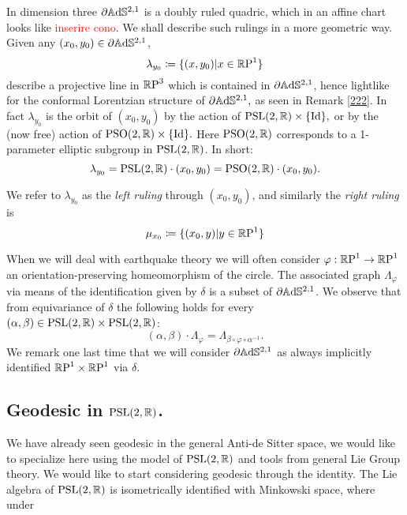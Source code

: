 In dimension three $\partial\A^{2,1}$ is a doubly ruled quadric, which in an affine chart looks like \textcolor{red}{inserire cono}. We shall describe such rulings in a more geometric way. Given any $(x_0,y_0)\in\partial\A^{2,1}$, 
\[
    \lambda_{y_0}\coloneqq\{(x,y_0)|x\in\R\text{P}^1\}
\]  
describe a projective line in $\R\text{P}^3$ which is contained in $\partial\A^{2,1}$, hence lightlike for the conformal Lorentzian structure of $\partial\A^{2,1},$ as seen in Remark \ref{222}. In fact $\lambda_{y_0}$ is the orbit of $(x_0,y_0)$ by the action of $\text{PSL}(2,\R)\times\{\text{Id}\},$ or by the (now free) action of $\text{PSO}(2,\R)\times\{\text{Id}\}.$ Here $\text{PSO}(2,\R)$ corresponds to a 1-parameter elliptic subgroup in $\text{PSL}(2,\R)$. In short: 
\[
    \lambda_{y_0}=\text{PSL}(2,\R)\cdot(x_0,y_0)=\text{PSO}(2,\R)\cdot(x_0,y_0).
\]

We refer to $\lambda_{y_0}$ as the \textit{left ruling} through $(x_0,y_0)$, and similarly the \textit{right ruling} is 
\[
    \mu_{x_0}\coloneqq\{(x_0,y)|y\in\R\text{P}^1\}
\]

When we will deal with earthquake theory we will often consider $\varphi:\S\to\S$ an orientation-preserving homeomorphism of the circle. The associated graph $\Lambda_\varphi$ via means of the identification given by $\delta$ is a subset of $\partial\A^{2,1}$. We observe that from equivariance of $\delta$ the following holds for every $(\alpha,\beta)\in\text{PSL}(2,\R)\times\text{PSL}(2,\R)$: 
\begin{equation}\label{graphequivariancy}
(\alpha,\beta)\cdot\Lambda_\varphi=\Lambda_{\beta\circ\varphi\circ\alpha^{-1}}.
\end{equation}
We remark one last time that we will consider $\partial\A^{2,1}$ as always implicitly identified $\T$ via $\delta$.

\subsection{Geodesic in $\PSL$.} We have already seen geodesic in the general Anti-de Sitter space, we would like to specialize here using the model of $\PSL$ and tools from general Lie Group theory.  We would like to start considering geodesic through the identity. The Lie algebra of $\PSL$ is isometrically identified with Minkowski space, where under

